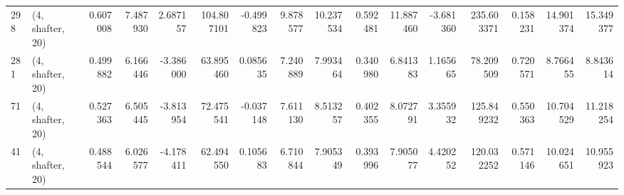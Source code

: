 \begin{tabular}{llrrrrrrrrrrrrrr}
298 &  (4, shafter, 20) &   0.607008 &   7.487930 &   2.687157 &   104.807101 &  -0.499823 &   9.878577 &  10.237534 &  0.592481 &  11.887460 &  -3.681360 &   235.603371 &   0.158231 &  14.901374 &  15.349377 \\
281 &  (4, shafter, 20) &   0.499882 &   6.166446 &  -3.386000 &    63.895460 &   0.085635 &   7.240889 &   7.993464 &  0.340980 &   6.841383 &   1.165665 &    78.209509 &   0.720571 &   8.766455 &   8.843614 \\
71  &  (4, shafter, 20) &   0.527363 &   6.505445 &  -3.813954 &    72.475541 &  -0.037148 &   7.611130 &   8.513257 &  0.402355 &   8.072791 &   3.355932 &   125.849232 &   0.550363 &  10.704529 &  11.218254 \\
41  &  (4, shafter, 20) &   0.488544 &   6.026577 &  -4.178411 &    62.494550 &   0.105683 &   6.710844 &   7.905349 &  0.393996 &   7.905077 &   4.420252 &   120.032252 &   0.571146 &  10.024651 &  10.955923 \\
\bottomrule
\end{tabular}
